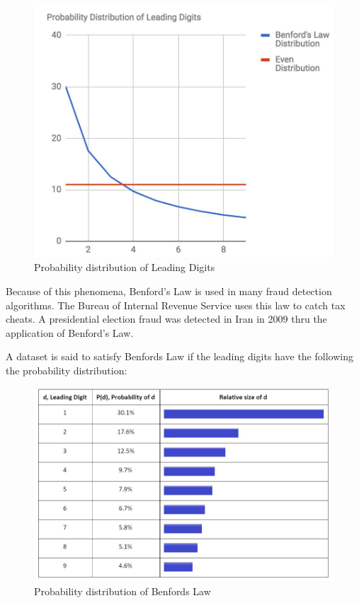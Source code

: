\begin{figure}[!ht]
\centering\includegraphics[width=\columnwidth]{images/probability_dist.JPG}
  \caption{Probability distribution of Leading Digits}\label{f:probability-dist-lead}
\end{figure}

Because of this phenomena, Benford’s Law is used in many 
fraud detection algorithms. The Bureau of Internal Revenue 
Service uses this law to catch tax cheats. 
A presidential election fraud was detected in 
Iran in 2009 thru the application of Benford’s Law.


A dataset is said to satisfy Benfords Law if the leading 
digits have the following the probability distribution: 

\begin{figure}[!ht]
\centering\includegraphics[width=\columnwidth]{images/benfords_law.JPG}
  \caption{Probability distribution of Benfords Law}\label{f:probability-dist-benfordlaw}
\end{figure}


